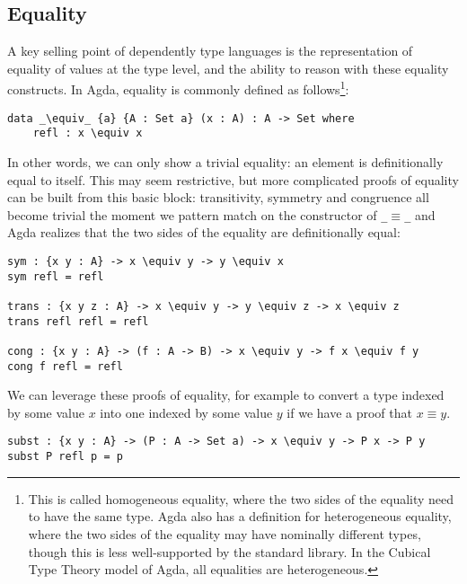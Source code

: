 \subsection{Equality}
A key selling point of dependently type languages is the representation of equality of values at the type level, and the ability to reason with these equality constructs. In Agda, equality is commonly defined as follows\footnote{This is called homogeneous equality, where the two sides of the equality need to have the same type. Agda also has a definition for heterogeneous equality, where the two sides of the equality may have nominally different types, though this is less well-supported by the standard library. In the Cubical Type Theory model of Agda, all equalities are heterogeneous.}:

\begin{lstlisting}[caption={Equality in Agda},label={lst:tutorial:equality},emph={refl}]
data _\equiv_ {a} {A : Set a} (x : A) : A -> Set where
    refl : x \equiv x
\end{lstlisting}

In other words, we can only show a trivial equality: an element is definitionally equal to itself. This may seem restrictive, but more complicated proofs of equality can be built from this basic block: transitivity, symmetry and congruence all become trivial the moment we pattern match on the constructor of \texttt{\_$\equiv$\_} and Agda realizes that the two sides of the equality are definitionally equal:

\begin{lstlisting}[caption={Reasoning in Agda},label={lst:tutorial:reasoning
},emph={sym,cong,trans}]
sym : {x y : A} -> x \equiv y -> y \equiv x
sym refl = refl

trans : {x y z : A} -> x \equiv y -> y \equiv z -> x \equiv z
trans refl refl = refl

cong : {x y : A} -> (f : A -> B) -> x \equiv y -> f x \equiv f y
cong f refl = refl
\end{lstlisting}

We can leverage these proofs of equality, for example to convert a type indexed by some value $x$ into one indexed by some value $y$ if we have a proof that $x \equiv y$.

\begin{lstlisting}[caption={Substitution},label={lst:tutorial:subst},emph={subst}]
subst : {x y : A} -> (P : A -> Set a) -> x \equiv y -> P x -> P y
subst P refl p = p
\end{lstlisting}

